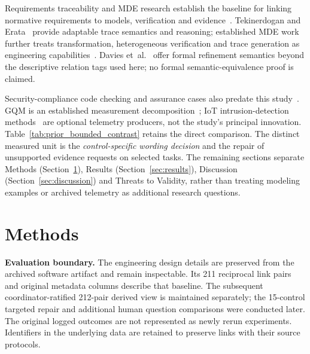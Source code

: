 \documentclass[12pt,a4paper]{article}
\begin{document}
Requirements traceability and MDE research establish the baseline for linking normative requirements to models, verification and evidence~\cite{Gotel1994Traceability,RameshJarke2001Traceability,Hallerstede2014SCP_TraceReqSpec,Sadovykh2024SCP_MBRE,Santiago2012MDETraceSLR,Firesmith2003SecurityRequirements,Haley2008SecurityRequirements}. Tekinerdogan and Erata~\cite{TekinerdoganErata2020SCICO} provide adaptable trace semantics and reasoning; established MDE work further treats transformation, heterogeneous verification and trace generation as engineering capabilities~\cite{Hutchinson2014SCP_MDEIndustry,SanchezCuadrado2014SCP_SmallMDE,Davies2015SCP_FormalMDE,Calegari2015SCP_Institution,Calegari2016SCP_Heterogeneous,JimenezRielo2015SCP_MeTAGeM,Jouault2008SCP_ATL,Muram2019SCP_Containment}. Davies et~al.~\cite{DaviesEtAl2020SCICO} offer formal refinement semantics beyond the descriptive relation tags used here; no formal semantic-equivalence proof is claimed.

Security-compliance code checking and assurance cases also predate this study~\cite{Tuma2023SecurityCompliance,KellyWeaver2004GSN}. GQM is an established measurement decomposition~\cite{Basili2014GQM}; IoT intrusion-detection methods~\cite{Apruzzese2022,Li2024_ESWA_LightIDS} are optional telemetry producers, not the study's principal innovation. Table~\ref{tab:prior_bounded_contrast} retains the direct comparison. The distinct measured unit is the \emph{control-specific wording decision} and the repair of unsupported evidence requests on selected tasks. The remaining sections separate Methods (Section~\ref{sec:methods}), Results (Section~\ref{sec:results}), Discussion (Section~\ref{sec:discussion}) and Threats to Validity, rather than treating modeling examples or archived telemetry as additional research questions.


\section{Methods}\label{sec:methods}
\noindent\textbf{Evaluation boundary.} The engineering design details are preserved from the archived software artifact and remain inspectable. Its 211 reciprocal link pairs and original metadata columns describe that baseline. The subsequent coordinator-ratified 212-pair derived view is maintained separately; the 15-control targeted repair and additional human question comparisons were conducted later. The original logged outcomes are not represented as newly rerun experiments. Identifiers in the underlying data are retained to preserve links with their source protocols.
\end{document}

